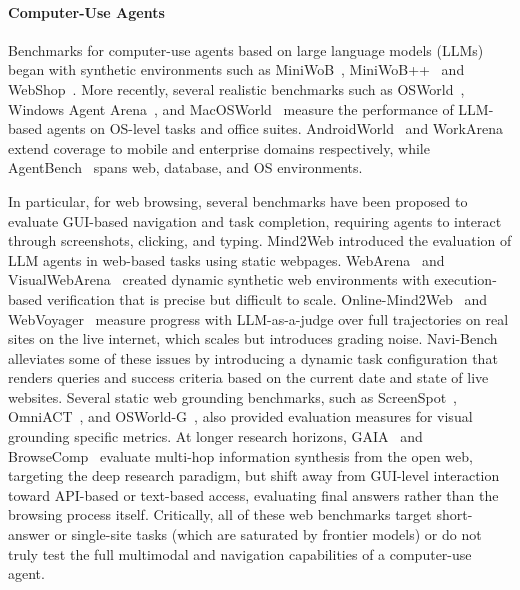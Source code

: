 \documentclass{article}
\theoremstyle{plain}
\theoremstyle{definition}
\theoremstyle{remark}
\begin{document}
\paragraph{Computer-Use Agents}
Benchmarks for computer-use agents based on large language models (LLMs) began with synthetic environments such as MiniWoB~\citep{shi2017world}, MiniWoB++~\citep{liu2018reinforcement} and WebShop~\citep{yao2022webshop}.
More recently, several realistic benchmarks such as OSWorld~\citep{xie2024osworld}, Windows Agent Arena~\citep{bonatti2024windows}, and MacOSWorld~\citep{yang2025macosworld} measure the performance of LLM-based agents on OS-level tasks and office suites.
AndroidWorld~\citep{rawles2024androidworld} and WorkArena~\citep{drouin2024workarena} extend coverage to mobile and enterprise domains respectively, while
AgentBench~\citep{liu2023agentbench} spans web, database, and OS environments.

In particular, for web browsing, several benchmarks have been proposed to evaluate GUI-based navigation and task completion, requiring agents to interact through screenshots, clicking, and typing. Mind2Web \citep{deng2023mind2web} introduced the evaluation of LLM agents in web-based tasks using static webpages.
WebArena~\citep{zhou2023webarena} and VisualWebArena~\citep{koh2024visualwebarena} created dynamic synthetic web environments with execution-based verification that is precise but difficult to scale.
Online-Mind2Web~\citep{xue2025illusion} and WebVoyager~\citep{he2024webvoyager} measure progress with LLM-as-a-judge over full trajectories on real sites on the live internet, which scales but introduces grading noise. Navi-Bench~\citep{yutori2025navigator} alleviates some of these issues by introducing a dynamic task configuration that renders queries and success criteria based on the current date and state of live websites.
Several static web grounding benchmarks, such as ScreenSpot~\citep{cheng2024seeclickharnessingguigrounding, li2025screenspotproguigroundingprofessional}, OmniACT~\citep{kapoor2024omniactdatasetbenchmarkenabling}, and OSWorld-G~\citep{xie2025scalingcomputerusegroundinguser}, also provided evaluation measures for visual grounding specific metrics.
At longer research horizons, GAIA~\citep{mialon2023gaiabenchmarkgeneralai} and BrowseComp~\citep{wei2025browsecompsimplechallengingbenchmark} evaluate multi-hop information synthesis from the open web, targeting the deep research paradigm, but shift away from GUI-level interaction toward API-based or text-based access, evaluating final answers rather than the browsing process itself.
Critically, all of these web benchmarks target short-answer or single-site tasks (which are saturated by frontier models) or do not truly test the full multimodal and navigation capabilities of a computer-use agent.
\end{document}
